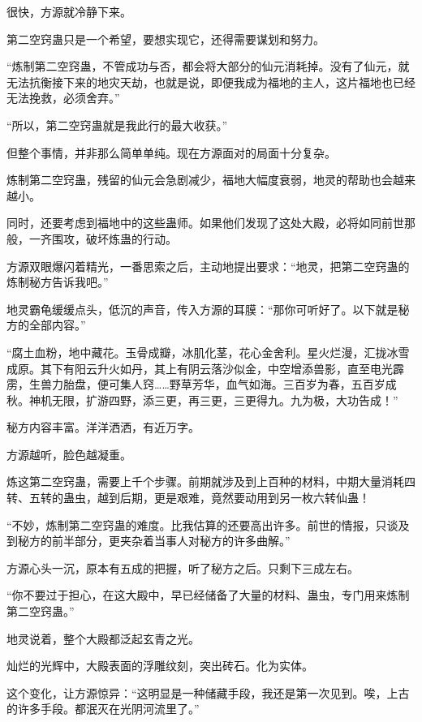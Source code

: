 
\begin{this_body}



很快，方源就冷静下来。

第二空窍蛊只是一个希望，要想实现它，还得需要谋划和努力。

“炼制第二空窍蛊，不管成功与否，都会将大部分的仙元消耗掉。没有了仙元，就无法抗衡接下来的地灾天劫，也就是说，即便我成为福地的主人，这片福地也已经无法挽救，必须舍弃。”

“所以，第二空窍蛊就是我此行的最大收获。”

但整个事情，并非那么简单单纯。现在方源面对的局面十分复杂。

炼制第二空窍蛊，残留的仙元会急剧减少，福地大幅度衰弱，地灵的帮助也会越来越小。

同时，还要考虑到福地中的这些蛊师。如果他们发现了这处大殿，必将如同前世那般，一齐围攻，破坏炼蛊的行动。

方源双眼爆闪着精光，一番思索之后，主动地提出要求：“地灵，把第二空窍蛊的炼制秘方告诉我吧。”

地灵霸龟缓缓点头，低沉的声音，传入方源的耳膜：“那你可听好了。以下就是秘方的全部内容。”

“腐土血粉，地中藏花。玉骨成瓣，冰肌化茎，花心金舍利。星火烂漫，汇拢冰雪成原。其下有阳云升火如丹，其上有阴云落沙似金，中空增添兽影，直至电光霹雳，生兽力胎盘，便可集人窍……野草芳华，血气如海。三百岁为春，五百岁成秋。神机无限，扩游四野，添三更，再三更，三更得九。九为极，大功告成！”

秘方内容丰富。洋洋洒洒，有近万字。

方源越听，脸色越凝重。

炼这第二空窍蛊，需要上千个步骤。前期就涉及到上百种的材料，中期大量消耗四转、五转的蛊虫，越到后期，更是艰难，竟然要动用到另一枚六转仙蛊！

“不妙，炼制第二空窍蛊的难度。比我估算的还要高出许多。前世的情报，只谈及到秘方的前半部分，更夹杂着当事人对秘方的许多曲解。”

方源心头一沉，原本有五成的把握，听了秘方之后。只剩下三成左右。

“你不要过于担心，在这大殿中，早已经储备了大量的材料、蛊虫，专门用来炼制第二空窍蛊。”

地灵说着，整个大殿都泛起玄青之光。

灿烂的光辉中，大殿表面的浮雕纹刻，突出砖石。化为实体。

这个变化，让方源惊异：“这明显是一种储藏手段，我还是第一次见到。唉，上古的许多手段。都泯灭在光阴河流里了。”


\end{this_body}
